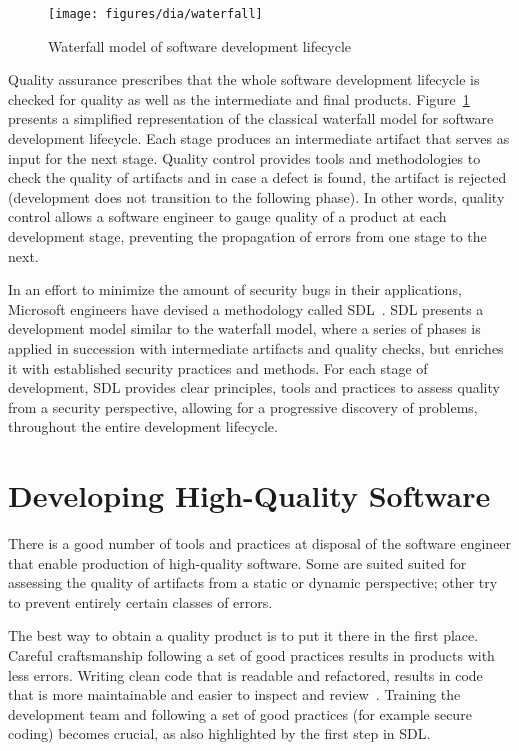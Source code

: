 \begin{figure}[h]
    \centering
    \texttt{[image: figures/dia/waterfall]}
    \caption{Waterfall model of software development lifecycle}
    \label{fig:waterfall}
\end{figure}

Quality assurance prescribes that the whole software development lifecycle is
checked for quality as well as the intermediate and final products.
Figure~\ref{fig:waterfall} presents a simplified representation of the classical
waterfall model for software development lifecycle. Each stage produces an
intermediate artifact that serves as input for the next stage. Quality control
provides tools and methodologies to check the quality of artifacts and in case a
defect is found, the artifact is rejected (development does not transition to
the following phase). In other words, quality control allows a software engineer
to gauge quality of a product at each development stage, preventing the
propagation of errors from one stage to the next.

In an effort to minimize the amount of security bugs in their applications,
Microsoft engineers have devised a methodology called
\ac{SDL}~\cite{lipner2004trustworthy}. \ac{SDL} presents a development model
similar to the waterfall model, where a series of phases is applied in
succession with intermediate artifacts and quality checks, but enriches it with
established security practices and methods. For each stage of development,
\ac{SDL} provides clear principles, tools and practices to assess quality from a
security perspective, allowing for a progressive discovery of problems,
throughout the entire development lifecycle.

\section{Developing High-Quality Software}
\label{sec:dev-hq-sw}
There is a good number of tools and practices at disposal of the software
engineer that enable production of high-quality software. Some are suited suited
for assessing the quality of artifacts from a static or dynamic perspective;
other try to prevent entirely certain classes of errors.

The best way to obtain a quality product is to put it there in the first place.
Careful craftsmanship following a set of good practices results in products with
less errors. Writing clean code that is readable and refactored, results in code
that is more maintainable and easier to inspect and
review~\cite{martin2009clean,fowler1999refactoring}. Training the development
team and following a set of good practices (for example secure coding) becomes
crucial, as also highlighted by the first step in \ac{SDL}.

